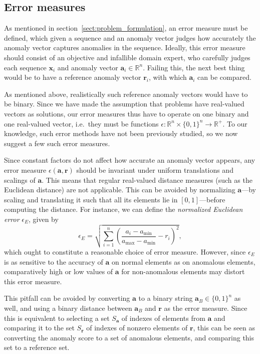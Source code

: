 \subsection{Error measures}
\label{sect:evaluation_measures}

As mentioned in section~\ref{sect:problem_formulation}, an error measure must be defined, which given a sequence and an anomaly vector judges how accurately the anomaly vector captures anomalies in the sequence. Ideally, this error measure should consist of an objective and infallible domain expert, who carefully judges each sequence $\mathbf{x}_i$ and anomaly vector $\mathbf{a}_i \in \mathbb{R}^n$. Failing this, the next best thing would be to have a reference anomaly vector $\mathbf{r}_i$, with which $\mathbf{a}_i$ can be compared.

As mentioned above, realistically such reference anomaly vectors would have to be binary. Since we have made the assumption that problems have real-valued vectors as solutions, our error measures thus have to operate on one binary and one real-valued vector, i.e.\ they must be functions $\epsilon: \mathbb{R}^n \times {\{0, 1\}}^n \rightarrow {\mathbb{R}}^+$. To our knowledge, such error methods have not been previously studied, so we now suggest a few such error measures.

Since constant factors do not affect how accurate an anomaly vector appears, any error measure $\epsilon(\mathbf{a}, \mathbf{r})$ should be invariant under uniform translations and scalings of $\mathbf{a}$. This means that regular real-valued distance measures (such as the Euclidean distance) are not applicable. This can be avoided by normalizing $\mathbf{a}$---by scaling and translating it such that all its elements lie in $[0,1]$---before computing the distance. For instance, we can define the \emph{normalized Euclidean error} $\epsilon_E$, given by
\[
    \epsilon_E = \sqrt{\sum_{i=1}^n {(\frac{a_i-a_{\min}}{a_{\max}-a_{\min}} - r_i)}^2},
\]
which ought to constitute a reasonable choice of error measure. However, since $\epsilon_E$ is as sensitive to the accuracy of $\mathbf{a}$ on normal elements as on anomalous elements, comparatively high or low values of $\mathbf{a}$ for non-anomalous elements may distort this error measure.

This pitfall can be avoided by converting $\mathbf{a}$ to a binary string $\mathbf{a}_B \in {\{0, 1\}}^n$ as well, and using a binary distance between $\mathbf{a}_B$ and $\mathbf{r}$ as the error measure. Since this is equivalent to selecting a set $S_\mathbf{a}$ of indexes of elements from $\mathbf{a}$ and comparing it to the set $S_\mathbf{r}$ of indexes of nonzero elements of $\mathbf{r}$, this can be seen as converting the anomaly score to a set of anomalous elements, and comparing this set to a reference set.

